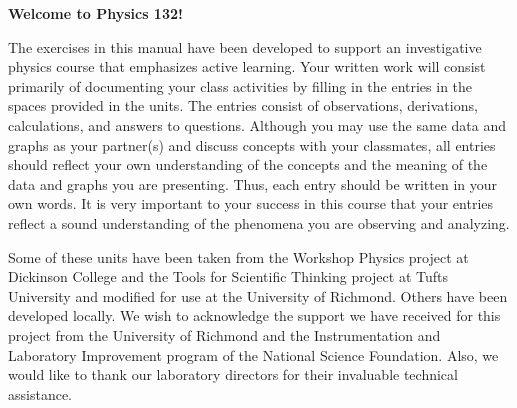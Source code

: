 \maketitle

\vspace{1 in}


\begin{center}
\large{\textbf{Welcome to Physics 132!}}
\end{center}

The exercises in this manual have been developed to support an investigative
physics course that emphasizes active learning. 
Your written work will consist primarily of documenting
your class activities by filling in the entries in the spaces provided
in the units. The entries consist of observations, derivations, calculations,
and answers to questions. Although you may use the same data and graphs
as your partner(s) and discuss concepts with your classmates, all
entries should reflect your own understanding of the concepts and
the meaning of the data and graphs you are presenting. Thus, each
entry should be written in your own words. It is very important
to your success in this course that your entries reflect a sound understanding
of the phenomena you are observing and analyzing. 

Some of these units
have been taken from the Workshop Physics project at Dickinson College
and the Tools for Scientific Thinking project at Tufts University
and modified for use at the University of Richmond. Others have been
developed locally. 
We wish to acknowledge the support we have received for this project
from the University of Richmond and the Instrumentation and Laboratory
Improvement program of the National Science Foundation. Also, we would
like to thank our laboratory directors for their invaluable technical
assistance.


\thispagestyle{plain}


\
\setcounter{page}{2} %

